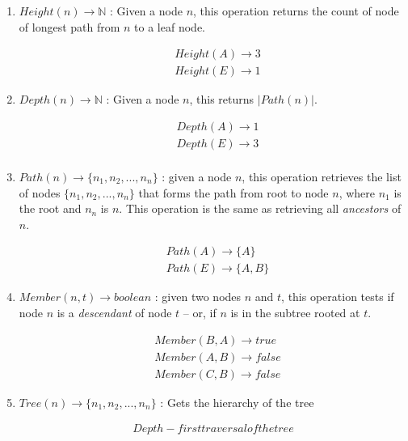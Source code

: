 \begin{enumerate}
\item $Height(n) \rightarrow \mathbb{N}$ : Given a node $n$, this operation returns the count of node of longest path from $n$ to a leaf node.

    \begin{align*}
    & Height(A) \rightarrow 3 \\
    & Height(E) \rightarrow 1
    \end{align*}
    
\item $Depth(n) \rightarrow \mathbb{N}$ : Given a node $n$, this returns $|Path(n)|$.

    \begin{align*}
    & Depth(A) \rightarrow 1 \\
    & Depth(E) \rightarrow 3 \\
    \end{align*}
    
\item $Path(n) \rightarrow \{n_1, n_2, ..., n_n\}$ : given a node $n$, this operation retrieves the list of nodes $\{n_1, n_2, ..., n_n\}$ that forms the path from root to node $n$, where $n_1$ is the root and $n_n$ is $n$. This operation is the same as retrieving all \emph{ancestors} of $n$.

    \begin{align*}
    & Path(A) \rightarrow \{A\} \\
    & Path(E) \rightarrow \{A, B\}
    \end{align*}
    
\item $Member(n, t) \rightarrow boolean$ : given two nodes $n$ and $t$, this operation tests if node $n$ is a \emph{descendant} of node $t$ -- or, if $n$ is in the subtree rooted at $t$.


    \begin{align*}
    & Member(B, A) \rightarrow true \\
    & Member(A, B) \rightarrow false \\
    & Member(C, B) \rightarrow false
    \end{align*}
    
\item $Tree(n) \rightarrow \{n_1, n_2, ..., n_n\}$ : Gets the hierarchy of the tree

    \begin{align*}
    Depth-first traversal of the tree
    \end{align*}

\end{enumerate} %



